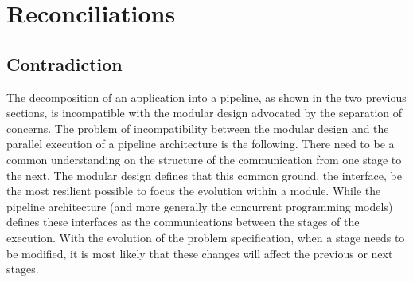 









\section{Reconciliations} \label{chapter3:reconciliations}

\subsection{Contradiction}

The decomposition of an application into a pipeline, as shown in the two previous sections, is incompatible with the modular design advocated by the separation of concerns.
The problem of incompatibility between the modular design and the parallel execution of a pipeline architecture is the following.
There need to be a common understanding on the structure of the communication from one stage to the next.
The modular design defines that this common ground, the interface, be the most resilient possible to focus the evolution within a module.
While the pipeline architecture (and more generally the concurrent programming models) defines these interfaces as the communications between the stages of the execution.
With the evolution of the problem specification, when a stage needs to be modified, it is most likely that these changes will affect the previous or next stages.

